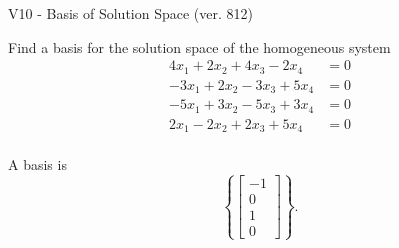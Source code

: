 \begin{exercise}
  \begin{exerciseTitle}V10 - Basis of Solution Space (ver. 812)\end{exerciseTitle}
  \begin{exerciseStatement}
    Find a basis for the solution space of the homogeneous system 
\begin{align*}
 4 x_ 1 + 2 x_ 2 + 4 x_ 3 -2 x_ 4 &= 0  \\ 
  -3 x_ 1 + 2 x_ 2 -3 x_ 3 + 5 x_ 4 &= 0  \\ 
  -5 x_ 1 + 3 x_ 2 -5 x_ 3 + 3 x_ 4 &= 0  \\ 
  2 x_ 1 -2 x_ 2 + 2 x_ 3 + 5 x_ 4 &= 0  \\ 
 \end{align*}


 
  \end{exerciseStatement}

  \begin{exerciseAnswer}
   A basis is   
\[\left\{\left[\begin{array}{c}
-1 \\
0 \\
1 \\
0
\end{array}\right]\right\}.\]

  


  \end{exerciseAnswer}
\end{exercise}